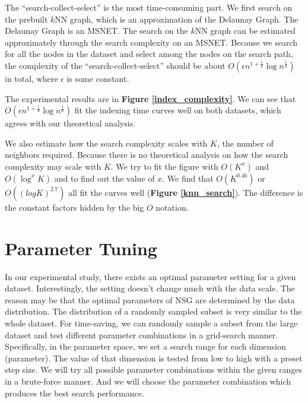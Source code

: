 \documentclass{vldb}
\begin{document}
\begin{appendix}
The ``search-collect-select'' is the most time-consuming part. We first search on the prebuilt $k$NN graph, which is an approximation of the Delaunay Graph. The Delaunay Graph is an MSNET. The search on the $k$NN graph can be estimated approximately through the search complexity on an MSNET. Because we search for all the nodes in the dataset and select among the nodes on the search path, the complexity of the ``search-collect-select'' should be about $O(\epsilon n^{1+\frac{1}{d}}\log n^{\frac{1}{d}})$ in total, where $\epsilon$ is some constant.

The experimental results are in \textbf{Figure \ref{index_complexity}}. We can see that $O(\epsilon n^{1+\frac{1}{d}}\log n^{\frac{1}{d}})$ fit the indexing time curves well on both datasets, which agrees with our theoretical analysis. 

We also estimate how the search complexity scales with $K$, the number of neighbors required. Because there is no theoretical analysis on how the search complexity may scale with $K$. We try to fit the figure with $O(K^x)$ and $O(\log^x K)$ and to find out the value of $x$. We find that $O(K^{0.46})$ or $O((logK)^{2.7})$ all fit the curves well (\textbf{Figure \ref{knn_search}}). The difference is the constant factors hidden by the big $O$ notation. 

\section{Parameter Tuning}
In our experimental study, there exists an optimal parameter setting for a given dataset. Interestingly, the setting doesn't change much with the data scale. The reason may be that the optimal parameters of NSG are determined by the data distribution. The distribution of a randomly sampled subset is very similar to the whole dataset. For time-saving, we can randomly sample a subset from the large dataset and test different parameter combinations in a grid-search manner. Specifically, in the parameter space, we set a search range for each dimension (parameter). The value of that dimension is tested from low to high with a preset step size. We will try all possible parameter combinations within the given ranges in a brute-force manner. And we will choose the parameter combination which produces the best search performance. 


\clearpage



\end{appendix}
\end{document}
